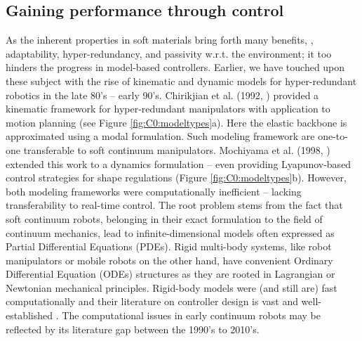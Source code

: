 \vspace{-2mm}
\subsection{Gaining performance through control}
\label{sec:C0:modelcontrol}
As the inherent properties in soft materials bring forth many benefits, \eg, adaptability, hyper-redundancy, and passivity w.r.t. the environment; it too hinders the progress in model-based controllers. Earlier, we have touched upon these subject with the rise of kinematic and dynamic models for hyper-redundant robotics in the late 80's -- early 90's. Chirikjian et al. (1992, \cite{Chirikjian1992}) provided a kinematic framework for hyper-redundant manipulators with application to motion planning (see Figure \ref{fig:C0:modeltypes}a). Here the elastic backbone is approximated using a modal formulation. Such modeling framework are one-to-one transferable to soft continuum manipulators. Mochiyama et al. (1998, \cite{Mochiyama1998,Mochiyama2003}) extended this work to a dynamics formulation -- even providing Lyapunov-based control strategies for shape regulations (Figure \ref{fig:C0:modeltypes}b). However, both modeling frameworks were computationally inefficient -- lacking transferability to real-time control. The root problem stems from the fact that soft continuum robots, belonging in their exact formulation to the field of continuum mechanics, lead to infinite-dimensional models often expressed as Partial Differential Equations (PDEs). Rigid multi-body systems, like robot manipulators or mobile robots on the other hand, have convenient Ordinary Differential Equation (ODEs) structures as they are rooted in Lagrangian or Newtonian mechanical principles. Rigid-body models were (and still are) fast computationally and their literature on controller design is vast and well-established \cite{Murray1994,Corke2011,Spong2006}. The computational issues in early continuum robots may be reflected by its literature gap between the 1990's to 2010's.

